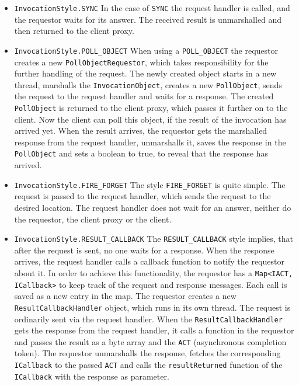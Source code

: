 \begin{itemize}
	\item \texttt{InvocationStyle.SYNC}
	In the case of \texttt{SYNC} the request handler is called, and the requestor waits for its answer. The received result is unmarshalled and then returned to the client proxy. 	
	\item \texttt{InvocationStyle.POLL\_OBJECT}
	When using a \texttt{POLL\_OBJECT} the requestor creates a new \texttt{PollObjectRequestor}, which takes responsibility for the further handling of the request. The newly created object starts in a new thread, marshalls the \texttt{InvocationObject}, creates a new \texttt{PollObject}, sends the request to the request handler and waits for a response. The created \texttt{PollObject} is returned to the client proxy, which passes it further on to the client. Now the client can poll this object, if the result of the invocation has arrived yet. When the result arrives, the requestor gets the marshalled response from the request handler, unmarshalls it, saves the response in the \texttt{PollObject} and sets a boolean to true, to reveal that the response has arrived.
	\item \texttt{InvocationStyle.FIRE\_FORGET}
	The style \texttt{FIRE\_FORGET} is quite simple. The request is passed to the request handler, which sends the request to the desired location. The request handler does not wait for an answer, neither do the requestor, the client proxy or the client.
	\item \texttt{InvocationStyle.RESULT\_CALLBACK}
	The \texttt{RESULT\_CALLBACK} style implies, that after the request is sent, no one waits for a response. When the response arrives, the request handler calls a callback function to notify the requestor about it. In order to achieve this functionality, the requestor has a \texttt{Map<IACT, ICallback>} to keep track of the request and response messages. Each call is saved as a new entry in the map. The requestor creates a new \texttt{ResultCallbackHandler} object, which runs in its own thread. The request is ordinarily sent via the request handler. When the \texttt{ResultCallbackHandler} gets the response from the request handler, it calls a function in the requestor and passes the result as a byte array and the \texttt{ACT} (asynchronous completion token). The requestor unmarshalls the response, fetches the corresponding \texttt{ICallback} to the passed \texttt{ACT} and calls the \texttt{resultReturned} function of the \texttt{ICallback} with the response as parameter.
\end{itemize}


